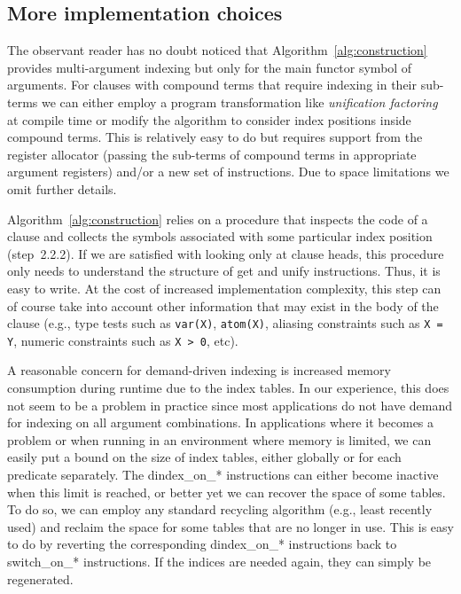 \documentclass{llncs}
\newcommand{\code}[1]{\texttt{#1}}
\newcommand{\instr}[1]{\textsf{#1}}
\newcommand{\jitiSTAR}{\mbox{\instr{dindex\_on\_*}}\xspace}
\newcommand{\switchSTAR}{\mbox{\instr{switch\_on\_*}}\xspace}
\newcommand{\JITI}{demand-driven indexing\xspace}
\begin{document}
\subsection{More implementation choices}
The observant reader has no doubt noticed that
Algorithm~\ref{alg:construction} provides multi-argument indexing but
only for the main functor symbol of arguments. For clauses with
compound terms that require indexing in their sub-terms we can either
employ a program transformation like \emph{unification
factoring}~\cite{UnifFact@POPL-95} at compile time or modify the
algorithm to consider index positions inside compound terms. This is
relatively easy to do but requires support from the register allocator
(passing the sub-terms of compound terms in appropriate argument
registers) and/or a new set of instructions. Due to space limitations
we omit further details.

Algorithm~\ref{alg:construction} relies on a procedure that inspects
the code of a clause and collects the symbols associated with some
particular index position (step~2.2.2). If we are satisfied with
looking only at clause heads, this procedure only needs to understand
the structure of \instr{get} and \instr{unify} instructions. Thus, it
is easy to write. At the cost of increased implementation complexity,
this step can of course take into account other information that may
exist in the body of the clause (e.g., type tests such as
\code{var(X)}, \code{atom(X)}, aliasing constraints such as \code{X =
Y}, numeric constraints such as \code{X > 0}, etc).

A reasonable concern for \JITI is increased memory consumption during
runtime due to the index tables. In our experience, this does not seem
to be a problem in practice since most applications do not have demand
for indexing on all argument combinations. In applications where it
becomes a problem or when running in an environment where memory is
limited, we can easily put a bound on the size of index tables, either
globally or for each predicate separately. The \jitiSTAR instructions
can either become inactive when this limit is reached, or better yet
we can recover the space of some tables. To do so, we can employ any
standard recycling algorithm (e.g., least recently used) and reclaim
the space for some tables that are no longer in use. This is easy to
do by reverting the corresponding \jitiSTAR instructions back to
\switchSTAR instructions. If the indices are needed again, they can
simply be regenerated.
\end{document}
